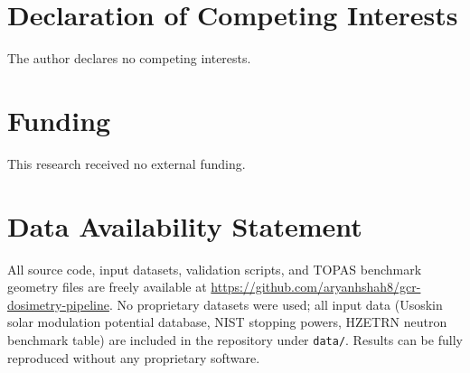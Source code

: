 \documentclass[12pt,letterpaper]{article}
\newcommand{\code}[1]{\texttt{#1}}
\begin{document}
\section*{Declaration of Competing Interests}

The author declares no competing interests.

\section*{Funding}

This research received no external funding.

\section*{Data Availability Statement}

All source code, input datasets, validation scripts, and TOPAS benchmark
geometry files are freely available at
\url{https://github.com/aryanhshah8/gcr-dosimetry-pipeline}.
No proprietary datasets were used; all input data (Usoskin solar
modulation potential database, NIST stopping powers, HZETRN neutron
benchmark table) are included in the repository under \code{data/}.
Results can be fully reproduced without any proprietary software.


\end{document}
